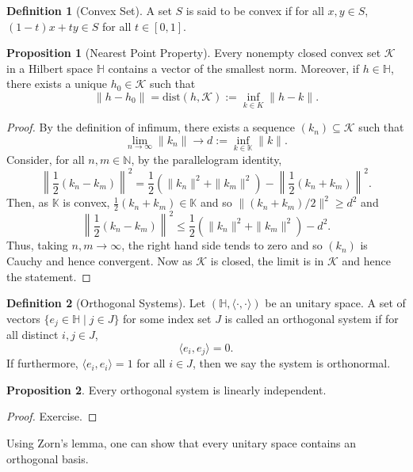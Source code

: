 \documentclass[]{article}
\theoremstyle{definition}
\theoremstyle{definition}
\newtheorem{definition}{Definition}[section]
\newtheorem{proposition}{Proposition}[section]
\begin{document}
\begin{definition}[Convex Set]
  A set \(S\) is said to be convex if for all \(x, y \in S\), 
  \((1 - t)x + ty \in S\) for all \(t \in [0, 1]\).
\end{definition}

\begin{proposition}[Nearest Point Property]
  Every nonempty closed convex set \(\mathcal{K}\) in a Hilbert space 
  \(\mathbb{H}\) contains a vector of the smallest norm. Moreover, if 
  \(h \in \mathbb{H}\), there exists a unique \(h_0 \in \mathcal{K}\) 
  such that 
  \[\|h - h_0\| = \text{dist}(h, \mathcal{K}) := \inf_{k \in K} \|h - k\|.\]
\end{proposition}
\begin{proof}
  By the definition of infimum, there exists a sequence 
  \((k_n) \subseteq \mathcal{K}\) such that 
  \[\lim_{n \to \infty} \|k_n\| \to d := \inf_{k \in \mathbb{K}} \|k\|.\]
  Consider, for all \(n, m \in \mathbb{N}\), by the parallelogram identity,
  \[\left\|\frac{1}{2}(k_n - k_m)\right\|^2 = 
    \frac{1}{2}(\|k_n\|^2 + \|k_m\|^2) - \left\|\frac{1}{2}(k_n + k_m)\right\|^2.\]
  Then, as \(\mathbb{K}\) is convex, \(\frac{1}{2}(k_n + k_m) \in \mathbb{K}\) 
  and so \(\|(k_n + k_m) / 2\|^2 \ge d^2\) and 
  \[\left\|\frac{1}{2}(k_n - k_m)\right\|^2 \le 
    \frac{1}{2}(\|k_n\|^2 + \|k_m\|^2) - d^2.\]
  Thus, taking \(n, m \to \infty\), the right hand side tends to zero and so 
  \((k_n)\) is Cauchy and hence convergent. Now as \(\mathcal{K}\) is closed, 
  the limit is in \(\mathcal{K}\) and hence the statement.
\end{proof}

\begin{definition}[Orthogonal Systems]
  Let \((\mathbb{H}, \langle \cdot, \cdot \rangle)\) be an unitary space. 
  A set of vectors \(\{e_j \in \mathbb{H} \mid j \in J\}\) for some index 
  set \(J\) is called an orthogonal system if for all distinct \(i, j \in J\), 
  \[\langle e_i, e_j \rangle = 0.\]
  If furthermore, \(\langle e_i, e_i \rangle = 1\) for all \(i \in J\), then 
  we say the system is orthonormal.
\end{definition}

\begin{proposition}
  Every orthogonal system is linearly independent.
\end{proposition}
\begin{proof}
  Exercise.
\end{proof}

Using Zorn's lemma, one can show that every unitary space contains an orthogonal 
basis.
\end{document}
